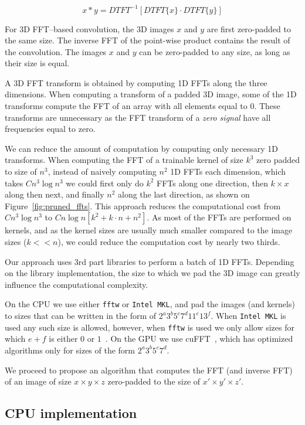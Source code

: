 \documentclass[conference]{IEEEtran}
\begin{document}
  $$x \ast y = DTFT^{-1}[DTFT\{x\} \cdot DTFT\{y\}]$$

  For 3D FFT--based convolution, the 3D images $x$ and $y$ are first
  zero-padded to the same size.  The inverse FFT of the point-wise
  product contains the result of the convolution.  The images $x$ and
  $y$ can be zero-padded to any size, as long as their size is equal.

  A 3D FFT transform is obtained by computing 1D FFTs along the three
  dimensions.  When computing a transform of a padded 3D image, some
  of the 1D transforms compute the FFT of an array with all elements
  equal to $0$.  These transforms are unnecessary as the FFT transform
  of a \emph{zero signal} have all frequencies equal to zero.

  We can reduce the amount of computation by computing only necessary
  1D transforms.  When computing the FFT of a trainable kernel of size
  $k^3$ zero padded to size of $n^3$, instead of naively computing
  $n^2$ 1D FFTs each dimension, which takes $C n^3 \log n^3$ we could
  first only do $k^2$ FFTs along one direction, then $k \times x$
  along then next, and finally $n^2$ along the last direction, as
  shown on Figure~\ref{fig:pruned_ffts}.  This approach reduces the
  computational cost from $C n^3 \log n^3$ to $C n\log n[k^2 + k \cdot
    n + n^2]$.  As most of the FFTs are performed on kernels, and as
  the kernel sizes are usually much smaller compared to the image
  sizes ($k << n$), we could reduce the computation cost by nearly two
  thirds.

  Our approach uses $3$rd part libraries to perform a batch of 1D
  FFTs.  Depending on the library implementation, the size to which we
  pad the 3D image can greatly influence the computational complexity.

  On the CPU we use either {\tt fftw} or {\tt Intel MKL}, and pad the
  images (and kernels) to sizes that can be written in the form of
  $2^a3^b5^c7^d11^e13^f$.  When {\tt Intel MKL} is used any such size
  is allowed, however, when {\tt fftw} is used we only allow sizes for
  which $e+f$ is either $0$ or $1$~\cite{frigo1999fftw,frigo1998fftw}.
  On the GPU we use cuFFT~\cite{nvidia2010cufft}, which has optimized
  algorithms only for sizes of the form $2^a3^b5^c7^d$.

  We proceed to propose an algorithm that computes the FFT (and
  inverse FFT) of an image of size $x \times y \times z$ zero-padded
  to the size of $x' \times y' \times z'$.

\subsection{CPU implementation}
\end{document}
